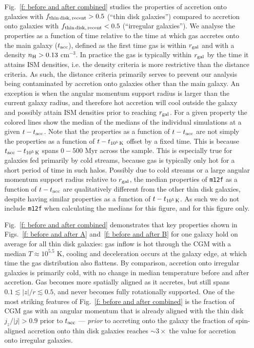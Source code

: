 \documentclass[fleqn,usenatbib]{mnras}
\newcommand{\fthin}{f_{\rm thin\,disk,\,recent}}
\newcommand{\tcools}{t_{10^5\,{\rm K}}}
\newcommand{\tacc}{t_{\rm acc}}
\begin{document}
Fig.~\ref{f: before and after combined} studies the properties of accretion onto galaxies with $\fthin > 0.5$ (``thin disk galaxies'') compared to accretion onto galaxies with $\fthin < 0.5$ (``irregular galaxies'').
We analyse the properties as a function of time relative to the time at which gas accretes onto the main galaxy ($\tacc$), defined as the first time gas is within $r_{\rm gal}$ and with a density $n_{\rm H} > 0.13$ cm$^{-3}$.
In practice the gas is typically within $r_{\rm gal}$ by the time it attains ISM densities, i.e. the density criteria is more restrictive than the distance criteria.
As such, the distance criteria primarily serves to prevent our analysis being contaminated by accretion onto galaxies other than the main galaxy.
An exception is when the angular momentum support radius is larger than the current galaxy radius, and therefore hot accretion will cool outside the galaxy and possibly attain ISM densities prior to reaching $r_{\rm gal}$.
For a given property the colored lines show the median of the medians of the individual simulations at a given $t - \tacc$.
Note that the properties as a function of $t - \tacc$ are not simply the properties as a function of $t - \tcools$ offset by a fixed time.
This is because $\tacc - \tcools$ spans $0-500$ Myr across the sample.
This is especially true for galaxies fed primarily by cold streams, because gas is typically only hot for a short period of time in such halos.
Possibly due to cold streams or a large angular momentum support radius relative to $r_{\rm gal}$, the median properties of \texttt{m12f} as a function of $t - \tacc$ are qualitatively different from the other thin disk galaxies, despite having similar properties as a function of $t - \tcools$.
As such we do not include \texttt{m12f} when calculating the medians for this figure, and for this figure only.

Fig.~\ref{f: before and after combined} demonstrates that key properties shown in Figs.~\ref{f: before and after A} and~\ref{f: before and after B} for one galaxy hold on average for all thin disk galaxies:
gas inflow is hot through the CGM with a median $T \approx 10^{5.5}$ K,
cooling and deceleration occurs at the galaxy edge,
at which time the gas distribution also flattens.
By comparison, accretion onto irregular galaxies is primarily cold, with no change in median temperature before and after accretion.
Gas becomes more spatially aligned as it accretes, but still spans $0.1 \lesssim \vert z \vert / r \lesssim 0.5$, and never becomes fully rotationally supported.
One of the most striking features of Fig.~\ref{f: before and after combined} is the fraction of CGM gas with an angular momentum that is already aligned with the thin disk $j_z/\vert j \vert > 0.9$ prior to $\tacc$ --- \textit{prior} to accreting onto the galaxy the fraction of spin-aligned accretion onto thin disk galaxies reaches ${\sim} 3 \times$ the value for accretion onto irregular galaxies.
\end{document}

